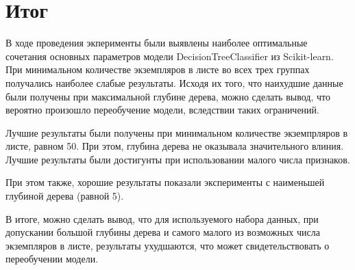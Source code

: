 \documentclass[a4paper,12pt]{article}
\begin{document}
\newpage\section{Итог}
	В ходе проведения экперименты были выявлены наиболее оптимальные сочетания основных параметров модели DecisionTreeClassifier из Scikit-learn. При минимальном количестве экземпляров в листе во всех трех группах получались наиболее слабые результаты. Исходя их того, что наихудшие данные были получены при максимальной глубине дерева, можно сделать вывод, что вероятно произошло переобучение модели, вследствии таких ограничений. 
	
	\vspace{0.5cm}
	Лучшие результаты были получены при минимальном количестве экземпрляров в листе, равном 50. При этом, глубина дерева не оказывала значительного влиния. Лучшие результаты были достигунты при использовании малого числа признаков. 
	
	\vspace{0.5cm}
	При этом также, хорошие результаты показали эксперименты с наименьшей глубиной дерева (равной 5).
	
	\vspace{0.5cm}
	В итоге, можно сделать вывод, что для используемого набора данных, при допускании большой глубины дерева и самого малого из возможных числа экземпляров в листе, результаты ухудшаются, что может свидетельствовать о переобучении модели.
	
	
\end{document}
